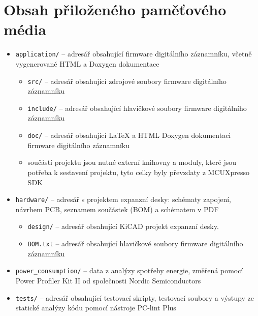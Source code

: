 
%

\chapter{Obsah přiloženého paměťového média}

\begin{itemize}
    \item \texttt{application/} -- adresář obsahující firmware digitálního záznamníku, včetně vygenerované HTML a Doxygen dokumentace
    \begin{itemize}
        \item \texttt{src/} -- adresář obsahující zdrojové soubory firmware digitálního záznamníku
        \item \texttt{include/} -- adresář obsahující hlavičkové soubory firmware digitálního záznamníku
        \item \texttt{doc/} -- adresář obsahující LaTeX a HTML Doxygen dokumentaci firmware digitálního záznamníku
        \item součástí projektu jsou nutné externí knihovny a moduly, které jsou potřeba k sestavení projektu, tyto celky byly převzdaty z MCUXpresso SDK
    \end{itemize}
    \item \texttt{hardware/} -- adresář s projektem expanzní desky: schématy zapojení, návrhem PCB, seznamem součástek (BOM) a schématem v PDF

    \begin{itemize}
        \item \texttt{design/} -- adresář obsahující KiCAD projekt expanzní desky.
        \item \texttt{BOM.txt} -- adresář obsahující hlavičkové soubory firmware digitálního záznamníku
    \end{itemize}
    
    \item \texttt{power\_consumption/} -- data z analýzy spotřeby energie, změřená pomocí Power Profiler Kit II od společnosti Nordic Semiconductors
    
    \item \texttt{tests/} -- adresář obsahující testovací skripty, testovací soubory a výstupy ze statické analýzy kódu pomocí nástroje PC-lint Plus


\end{itemize}
